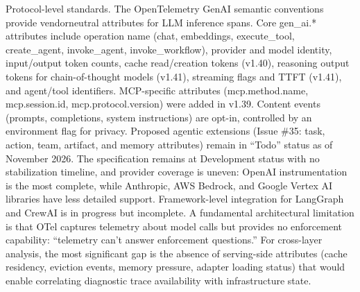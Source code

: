 \documentclass[preprint,12pt]{elsarticle}
\begin{document}
Protocol-level standards. The OpenTelemetry GenAI semantic conventions \cite{v5ref25} provide vendorneutral attributes for LLM inference spans. Core gen\_ai.* attributes include operation name (chat, embeddings, execute\_tool, create\_agent, invoke\_agent, invoke\_workflow), provider and model identity, input/output token counts, cache read/creation tokens (v1.40), reasoning output tokens for chain-of-thought models (v1.41), streaming flags and TTFT (v1.41), and agent/tool identifiers. MCP-specific attributes (mcp.method.name, mcp.session.id, mcp.protocol.version) were added in v1.39. Content events (prompts, completions, system instructions) are opt-in, controlled by an environment flag for privacy. Proposed agentic extensions (Issue \#35: task, action, team, artifact, and memory attributes) remain in ``Todo'' status as of November 2026. The specification remains at Development status with no stabilization timeline, and provider coverage is uneven: OpenAI instrumentation is the most complete, while Anthropic, AWS Bedrock, and Google Vertex AI libraries have less detailed support. Framework-level integration for LangGraph and CrewAI is in progress but incomplete. A fundamental architectural limitation is that OTel captures telemetry about model calls but provides no enforcement capability: ``telemetry can't answer enforcement questions.'' For cross-layer analysis, the most significant gap is the absence of serving-side attributes (cache residency, eviction events, memory pressure, adapter loading status) that would enable correlating diagnostic trace availability with infrastructure state.
\end{document}
